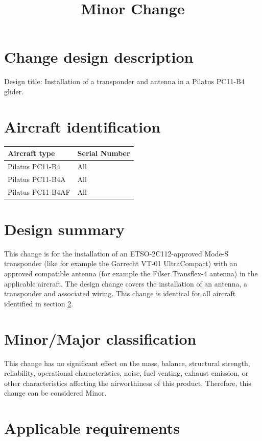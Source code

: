 \documentclass{article}
\begin{document}
\title{Minor Change}
\author{}
\date{}
\maketitle

\section{Change design description}
Design title: Installation of a transponder and antenna in a Pilatus PC11-B4 glider.

\section{Aircraft identification}
\label{section:identification}
\begin{tabular}{|l|l|}
\hline
Aircraft type & Serial Number \\
\hline
Pilatus PC11-B4 & All \\
Pilatus PC11-B4A & All \\
Pilatus PC11-B4AF & All \\
\hline
\end{tabular}

\section{Design summary}
This change is for the installation of an ETSO-2C112-approved Mode-S transponder (like for example the Garrecht VT-01 UltraCompact) with an approved compatible antenna (for example the Filser Transflex-4 antenna) in the applicable aircraft. The design change covers the installation of an antenna, a transponder and associated wiring. This change is identical for all aircraft identified in section \ref{section:identification}.

\section{Minor/Major classification}
This change has no significant effect on the mass, balance, structural strength, reliability, operational characteristics, noise, fuel venting, exhaust emission, or other characteristics affecting the airworthiness of this product. Therefore, this change can be considered Minor.

\section{Applicable requirements}
\end{document}
